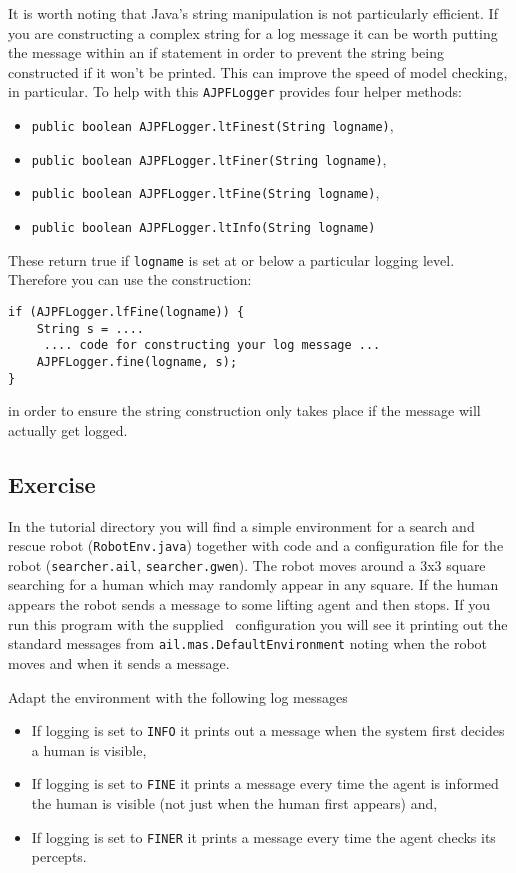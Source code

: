 \documentclass[a4]{article}
\begin{document}
It is worth noting that Java's string manipulation is not particularly efficient.  If you are constructing a complex string for a log message it can be worth putting the message within an if statement in order to prevent the string being constructed if it won't be printed.  This can improve the speed of model checking, in particular.  To help with this \texttt{AJPFLogger} provides four helper methods:
\begin{itemize}
\item  \texttt{public boolean AJPFLogger.ltFinest(String logname)}, 
\item \texttt{public boolean AJPFLogger.ltFiner(String logname)}, 
\item \texttt{public boolean AJPFLogger.ltFine(String logname)}, 
\item \texttt{public boolean AJPFLogger.ltInfo(String logname)} 
\end{itemize}
These return true if \texttt{logname} is set at or below a particular logging level.  Therefore you can use the construction:

\begin{verbatim}
if (AJPFLogger.lfFine(logname)) {
    String s = ....
     .... code for constructing your log message ...
    AJPFLogger.fine(logname, s);
}
\end{verbatim}
in order to ensure the string construction only takes place if the message will actually get logged.

\subsection{Exercise}
In the tutorial directory you will find a simple environment for a search and rescue robot (\texttt{RobotEnv.java}) together with code and a configuration file for the robot (\texttt{searcher.ail}, \texttt{searcher.gwen}).  The robot moves around a 3x3 square searching for a human which may randomly appear in any square.  If the human appears the robot sends a message to some lifting agent and then stops.  If you run this program with the supplied \ail\ configuration you will see it printing out the standard messages from \texttt{ail.mas.DefaultEnvironment} noting when the robot moves and when it sends a message.

Adapt the environment with the following log messages
\begin{itemize}
\item If logging is set to \texttt{INFO} it prints out a message when the system first decides a human is visible, 
\item If logging is set to \texttt{FINE} it prints a message every time the agent is informed the human is visible (not just when the human first appears) and,
\item If logging is set to \texttt{FINER} it prints a message every time the agent checks its percepts.
\end{itemize}
\end{document}
